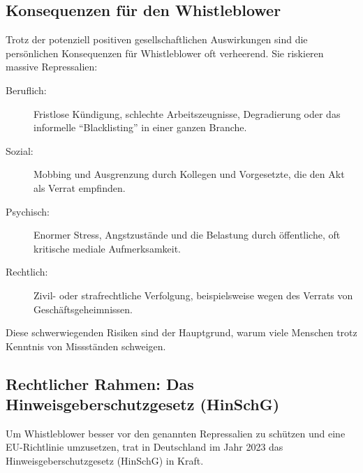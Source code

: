 \documentclass[
    12pt,               %
    a4paper,            %
    ngerman             %
]{scrartcl}
\begin{document}
\subsection{Konsequenzen für den Whistleblower}
Trotz der potenziell positiven gesellschaftlichen Auswirkungen sind die persönlichen Konsequenzen für Whistleblower oft verheerend. Sie riskieren massive Repressalien:
\begin{description}
    \item[Beruflich:] Fristlose Kündigung, schlechte Arbeitszeugnisse, Degradierung oder das informelle \enquote{Blacklisting} in einer ganzen Branche.
    \item[Sozial:] Mobbing und Ausgrenzung durch Kollegen und Vorgesetzte, die den Akt als Verrat empfinden.
    \item[Psychisch:] Enormer Stress, Angstzustände und die Belastung durch öffentliche, oft kritische mediale Aufmerksamkeit.
    \item[Rechtlich:] Zivil- oder strafrechtliche Verfolgung, beispielsweise wegen des Verrats von Geschäftsgeheimnissen.
\end{description}
Diese schwerwiegenden Risiken sind der Hauptgrund, warum viele Menschen trotz Kenntnis von Missständen schweigen.

\subsection{Rechtlicher Rahmen: Das Hinweisgeberschutzgesetz (HinSchG)}
Um Whistleblower besser vor den genannten Repressalien zu schützen und eine EU-Richtlinie umzusetzen, trat in Deutschland im Jahr 2023 das Hinweisgeberschutzgesetz (HinSchG) in Kraft.
\end{document}
